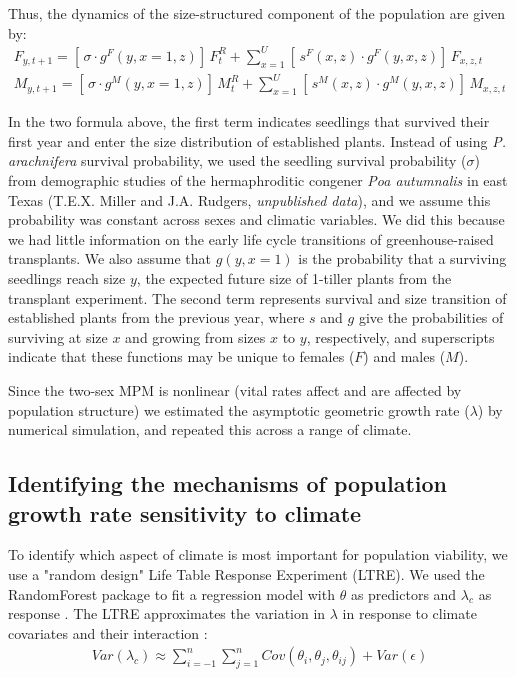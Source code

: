 \documentclass[12pt]{article}
\begin{document}
Thus, the dynamics of the size-structured component of the population are given by:
\begin{align}\label{eq:dynamics}
F_{y,t+1} = [ \, \sigma \cdot g^{F}(y,x=1,z) ] \, F^{R}_{t} + \sum_{x=1}^{U} 	[ \, s^{F}(x,z) \cdot g^{F}(y,x,z)] \, F_{x,z,t}
\\
M_{y,t+1} = [ \, \sigma \cdot g^{M}(y,x=1,z) ] \, M^{R}_{t} + \sum_{x=1}^{U} 	[ \,  s^{M}(x,z) \cdot g^{M}(y,x,z) ] \, M_{x,z,t}
\end{align}

\noindent In the two formula above, the first term indicates seedlings that survived their first year and enter the size distribution of established plants.
Instead of using \textit{P. arachnifera} survival probability, we used the seedling survival probability ($\sigma$) from demographic studies of the hermaphroditic congener \textit{Poa autumnalis} in east Texas (T.E.X. Miller and J.A. Rudgers, \textit{unpublished data}), and we assume this probability was constant across sexes and climatic variables. 
We did this because we had little information on the early life cycle transitions of greenhouse-raised transplants.
We also assume that $g(y,x=1)$ is the probability that a surviving seedlings reach size $y$, the expected future size of 1-tiller plants from the transplant experiment.
The second term represents survival and size transition of established plants from the previous year, where $s$ and $g$ give the probabilities of surviving at size $x$ and growing from sizes $x$ to $y$, respectively, and superscripts indicate that these functions may be unique to females ($F$) and males ($M$).

Since the two-sex MPM is nonlinear (vital rates affect and are affected by population structure) we estimated the asymptotic geometric growth rate ($\lambda$) by numerical simulation, and repeated this across a range of climate.

\subsection*{Identifying the mechanisms of population growth rate sensitivity to climate }
To identify which aspect of climate is most important for population viability, we use a "random design" Life Table Response Experiment (LTRE). 
We used the RandomForest package to fit a regression model with $\theta$ as predictors  and $\lambda_{c}$ as response \citep{ellner2016data,liaw2002classification}.
The LTRE approximates the variation in $\lambda$ in response to climate covariates and their interaction \citep{caswell2000matrix,hernandez2023exact}:
\begin{align}\label{eq:ltre}
Var(\lambda_{c})\approx \sum_{i=-1}^{n}\sum_{j=1}^{n} Cov(\theta_{i},\theta_{j},\theta_{ij}) + Var (\epsilon)
\end{align}
\end{document}
